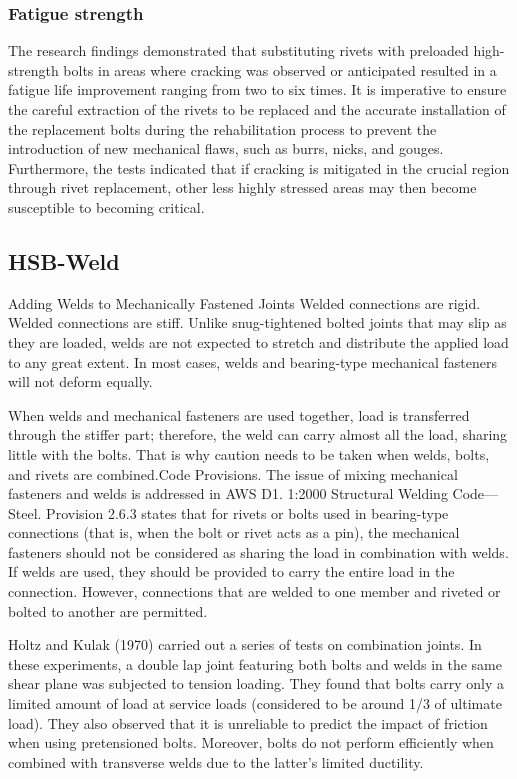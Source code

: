 \subsubsection{Fatigue strength}

The research findings \cite{steinhardt1969-hybrid, reemsnyder1975Fatigue} demonstrated that substituting rivets with preloaded high-strength bolts in areas where cracking was observed or anticipated resulted in a fatigue life improvement ranging from two to six times. It is imperative to ensure the careful extraction of the rivets to be replaced and the accurate installation of the replacement bolts during the rehabilitation process to prevent the introduction of new mechanical flaws, such as burrs, nicks, and gouges. Furthermore, the tests indicated that if cracking is mitigated in the crucial region through rivet replacement, other less highly stressed areas may then become susceptible to becoming critical.


\subsection{HSB-Weld} \label{sec-hsbweld}

Adding Welds to Mechanically Fastened Joints Welded connections are rigid. Welded connections are stiff. Unlike snug-tightened bolted joints that may slip as they are loaded, welds are not expected to stretch and distribute the applied load to any great extent. In most cases, welds and bearing-type mechanical fasteners will not deform equally.

When welds and mechanical fasteners are used together, load is transferred through the stiffer part; therefore, the weld can carry almost all the load, sharing little with the bolts. That is why caution needs to be taken when welds, bolts, and rivets are combined.Code Provisions. The issue of mixing mechanical fasteners and welds is addressed in AWS D1. 1:2000 Structural Welding Code—Steel. Provision 2.6.3 states that for rivets or bolts used in bearing-type connections (that is, when the bolt or rivet acts as a pin), the mechanical fasteners should not be considered as sharing the load in combination with welds. If welds are used, they should be provided to carry the entire load in the connection. However, connections that are welded to one member and riveted or bolted to another are permitted.


Holtz and Kulak (1970) \cite{holtz1970high} carried out a series of tests on combination joints. In these experiments, a double lap joint featuring both bolts and welds in the same shear plane was subjected to tension loading. They found that bolts carry only a limited amount of load at service loads (considered to be around 1/3 of ultimate load). They also observed that it is unreliable to predict the impact of friction when using pretensioned bolts. Moreover, bolts do not perform efficiently when combined with transverse welds due to the latter's limited ductility.



